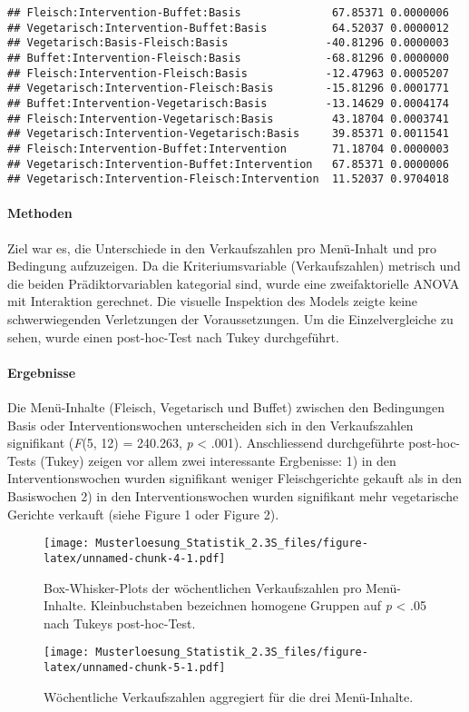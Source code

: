 \documentclass[]{article}
\let\oldparagraph\paragraph
\renewcommand{\paragraph}[1]{\oldparagraph{#1}\mbox{}}
\begin{document}
\begin{verbatim}
## Fleisch:Intervention-Buffet:Basis              67.85371 0.0000006
## Vegetarisch:Intervention-Buffet:Basis          64.52037 0.0000012
## Vegetarisch:Basis-Fleisch:Basis               -40.81296 0.0000003
## Buffet:Intervention-Fleisch:Basis             -68.81296 0.0000000
## Fleisch:Intervention-Fleisch:Basis            -12.47963 0.0005207
## Vegetarisch:Intervention-Fleisch:Basis        -15.81296 0.0001771
## Buffet:Intervention-Vegetarisch:Basis         -13.14629 0.0004174
## Fleisch:Intervention-Vegetarisch:Basis         43.18704 0.0003741
## Vegetarisch:Intervention-Vegetarisch:Basis     39.85371 0.0011541
## Fleisch:Intervention-Buffet:Intervention       71.18704 0.0000003
## Vegetarisch:Intervention-Buffet:Intervention   67.85371 0.0000006
## Vegetarisch:Intervention-Fleisch:Intervention  11.52037 0.9704018
\end{verbatim}

\paragraph{Methoden}\label{methoden}

Ziel war es, die Unterschiede in den Verkaufszahlen pro Menü-Inhalt und
pro Bedingung aufzuzeigen. Da die Kriteriumsvariable (Verkaufszahlen)
metrisch und die beiden Prädiktorvariablen kategorial sind, wurde eine
zweifaktorielle ANOVA mit Interaktion gerechnet. Die visuelle Inspektion
des Models zeigte keine schwerwiegenden Verletzungen der
Voraussetzungen. Um die Einzelvergleiche zu sehen, wurde einen
post-hoc-Test nach Tukey durchgeführt.

\paragraph{Ergebnisse}\label{ergebnisse}

Die Menü-Inhalte (Fleisch, Vegetarisch und Buffet) zwischen den
Bedingungen Basis oder Interventionswochen unterscheiden sich in den
Verkaufszahlen signifikant (\emph{F}(5, 12) = 240.263, \emph{p}
\textless{} .001). Anschliessend durchgeführte post-hoc-Tests (Tukey)
zeigen vor allem zwei interessante Ergbenisse: 1) in den
Interventionswochen wurden signifikant weniger Fleischgerichte gekauft
als in den Basiswochen 2) in den Interventionswochen wurden signifikant
mehr vegetarische Gerichte verkauft (siehe Figure 1 oder Figure 2).

\begin{figure}
\centering
\texttt{[image: Musterloesung\_Statistik\_2.3S\_files/figure-latex/unnamed-chunk-4-1.pdf]}
\caption{Box-Whisker-Plots der wöchentlichen Verkaufszahlen pro
Menü-Inhalte. Kleinbuchstaben bezeichnen homogene Gruppen auf \emph{p}
\textless{} .05 nach Tukeys post-hoc-Test.}
\end{figure}

\begin{figure}
\centering
\texttt{[image: Musterloesung\_Statistik\_2.3S\_files/figure-latex/unnamed-chunk-5-1.pdf]}
\caption{Wöchentliche Verkaufszahlen aggregiert für die drei
Menü-Inhalte.}
\end{figure}
\end{document}
